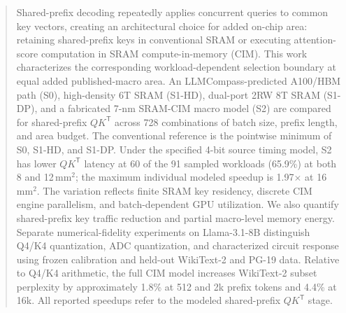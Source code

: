 %
\begin{abstract}
Shared-prefix decoding repeatedly applies concurrent queries to common key vectors, creating an architectural choice for added on-chip area: retaining shared-prefix keys in conventional SRAM or executing attention-score computation in SRAM compute-in-memory (CIM). This work characterizes the corresponding workload-dependent selection boundary at equal added published-macro area. An LLMCompass-predicted A100/HBM path (S0), high-density 6T SRAM (S1-HD), dual-port 2RW 8T SRAM (S1-DP), and a fabricated 7-nm SRAM-CIM macro model (S2) are compared for shared-prefix $QK^{\mathsf T}$ across 728 combinations of batch size, prefix length, and area budget. The conventional reference is the pointwise minimum of S0, S1-HD, and S1-DP. Under the specified 4-bit source timing model, S2 has lower $QK^{\mathsf T}$ latency at 60 of the 91 sampled workloads (65.9\%) at both 8 and 12\,mm$^2$; the maximum individual modeled speedup is 1.97$\times$ at 16\,mm$^2$. The variation reflects finite SRAM key residency, discrete CIM engine parallelism, and batch-dependent GPU utilization. We also quantify shared-prefix key traffic reduction and partial macro-level memory energy. Separate numerical-fidelity experiments on Llama-3.1-8B distinguish Q4/K4 quantization, ADC quantization, and characterized circuit response using frozen calibration and held-out WikiText-2 and PG-19 data. Relative to Q4/K4 arithmetic, the full CIM model increases WikiText-2 subset perplexity by approximately 1.8\% at 512 and 2k prefix tokens and 4.4\% at 16k. All reported speedups refer to the modeled shared-prefix $QK^{\mathsf T}$ stage.
\end{abstract}


